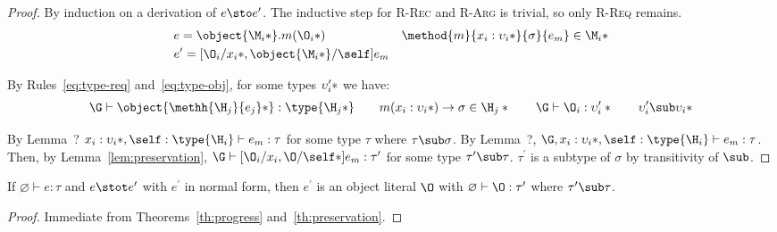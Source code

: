 \begin{theorem}[Preservation]
  \begin{proof}
    By induction on a derivation of $e \sto e^\prime$.  The inductive step for
    \textsc{R-Rec} and \textsc{R-Arg} is trivial, so only \textsc{R-Req}
    remains.
%
    \begin{align*}
      &e = \object{\*\M_i*}.m(\*\O_i*) &
      \method{m}{\*x_i : \upsilon_i*}{\sigma}{e_m} \in \*\M_i* \\
      &e^\prime = [\*\O_i/x_i*, \object{\*\M_i*}/\self]e_m &
    \end{align*}

    \noindent By Rules~\ref{eq:type-req} and~\ref{eq:type-obj}, for some types
    $\*\upsilon^\prime_i*$ we have:
%
    \begin{displaymath}
      \G \vdash \object{\*\methh{\H_j}{e_j}*} : \type{\*\H_j*} \quad\quad
      m(\*x_i : \upsilon_i*) \to \sigma \in \*\H_j* \quad\quad
      \G \vdash \*\O_i : \upsilon^\prime_i* \quad\quad
      \*\upsilon^\prime_i \sub \upsilon_i*
    \end{displaymath}

    \noindent By Lemma~? $\*x_i : \upsilon_i*, \self : \type{\H_i} \vdash e_m :
    \tau$ for some type $\tau$ where $\tau \sub \sigma$.  By Lemma~?, $\G, \*x_i
    : \upsilon_i*, \self : \type{\H_i} \vdash e_m : \tau$.  Then, by
    Lemma~\ref{lem:preservation}, $\G \vdash [\*\O_i/x_i,\O/\self*]e_m :
    \tau^\prime$ for some type $\tau^\prime \sub \tau$.  $\tau^\prime$ is a
    subtype of $\sigma$ by transitivity of $\sub$.
  \end{proof}

\end{theorem}

\begin{theorem}
  \label{th:type-soundness}

  If $\varnothing \vdash e : \tau$ and $e \stot e^\prime$ with $e^\prime$ in
  normal form, then $e^\prime$ is an object literal $\O$ with $\varnothing
  \vdash \O : \tau^\prime$ where $\tau^\prime \sub \tau$.

  \begin{proof}
    Immediate from Theorems~\ref{th:progress} and~\ref{th:preservation}.
  \end{proof}
\end{theorem}

